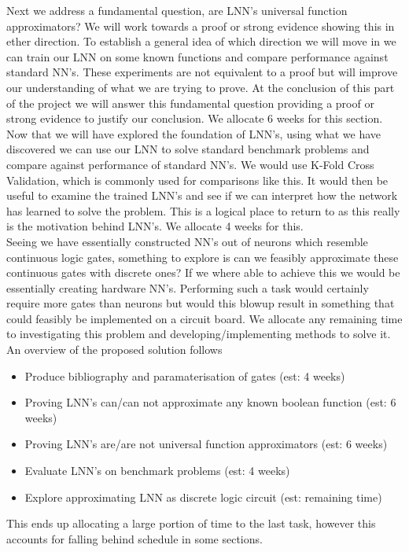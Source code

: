 \documentclass[11pt, a4paper, twoside, openright]{report}
\begin{document}
Next we address a fundamental question, are LNN's universal function approximators? We will work towards a proof or strong evidence showing this in ether direction. To establish a general idea of which direction we will move in we can train our LNN on some known functions and compare performance against standard NN's. These experiments are not equivalent to a proof but will improve our understanding of what we are trying to prove. At the conclusion of this part of the project we will answer this fundamental question providing a proof or strong evidence to justify our conclusion. We allocate 6 weeks for this section. \\

Now that we will have explored the foundation of LNN's, using what we have discovered we can use our LNN to solve standard benchmark problems and compare against performance of standard NN's. We would use K-Fold Cross Validation, which is commonly used for comparisons like this. It would then be useful to examine the trained LNN's and see if we can interpret how the network has learned to solve the problem. This is a logical place to return to as this really is the motivation behind LNN's. We allocate 4 weeks for this. \\

Seeing we have essentially constructed NN's out of neurons which resemble continuous logic gates, something to explore is can we feasibly approximate these continuous gates with discrete ones? If we where able to achieve this we would be essentially creating hardware NN's. Performing such a task would certainly require more gates than neurons but would this blowup result in something that could feasibly be implemented on a circuit board. We allocate any remaining time to investigating this problem and developing/implementing methods to solve it.\\

An overview of the proposed solution follows
\begin{itemize}
\item Produce bibliography and paramaterisation of gates (est: 4 weeks)
\item Proving LNN's can/can not approximate any known boolean function (est: 6 weeks)
\item Proving LNN's are/are not universal function approximators (est: 6 weeks)
\item Evaluate LNN's on benchmark problems (est: 4 weeks)
\item Explore approximating LNN as discrete logic circuit (est: remaining time)
\end{itemize}
This ends up allocating a large portion of time to the last task, however this accounts for falling behind schedule in some sections.
\end{document}

